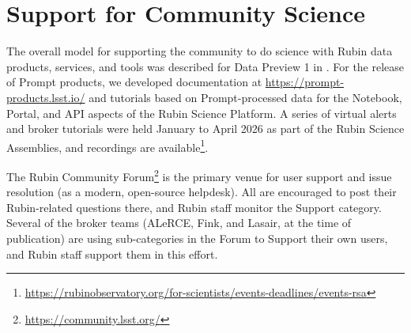 \section{Support for Community Science} \label{sec:support}


The overall model for supporting the community to do science with Rubin data products, services, and tools was described for Data Preview 1 in \cite{RTN-095}.
For the release of Prompt products, we developed documentation at \url{https://prompt-products.lsst.io/} and tutorials based on Prompt-processed data for the Notebook, Portal, and API aspects of the Rubin Science Platform.
A series of virtual alerts and broker tutorials were held January to April 2026 as part of the Rubin Science Assemblies, and recordings are available\footnote{\url{https://rubinobservatory.org/for-scientists/events-deadlines/events-rsa}}.

The Rubin Community Forum\footnote{\url{https://community.lsst.org/}} is the primary venue for user support and issue resolution (as a modern, open-source helpdesk).
All are encouraged to post their Rubin-related questions there, and Rubin staff monitor the Support category.
Several of the broker teams (ALeRCE, Fink, and Lasair, at the time of publication) are using sub-categories in the Forum to Support their own users, and Rubin staff support them in this effort.